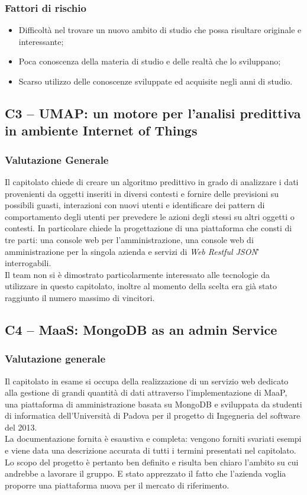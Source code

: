 \subsubsection{Fattori di rischio}
\begin{itemize}
\item Difficoltà nel trovare un nuovo ambito di studio che possa risultare originale e interessante;
\item Poca conoscenza della materia di studio e delle realtà che lo sviluppano;
\item Scarso utilizzo delle conoscenze sviluppate ed acquisite negli anni di studio.
\end{itemize}

\subsection{C3 – UMAP: un motore per l'analisi predittiva in ambiente Internet of Things}
\subsubsection{Valutazione Generale}
Il capitolato chiede di creare un algoritmo predittivo in grado di analizzare i dati provenienti da oggetti inseriti in diversi contesti e fornire delle previsioni su possibili guasti, interazioni con nuovi utenti e identificare dei pattern di comportamento degli utenti per prevedere le azioni degli stessi su altri oggetti o contesti. In particolare chiede la progettazione di una piattaforma che consti di tre parti: una console web per l'amministrazione, una console web di amministrazione per la singola azienda e servizi di \textit{Web Restful JSON\G\,} interrogabili.\\
Il team non si è dimostrato particolarmente interessato alle tecnologie da utilizzare in questo capitolato, inoltre al momento della scelta era già stato raggiunto il numero massimo di vincitori.

\subsection{C4 – MaaS: MongoDB as an admin Service}
\subsubsection{Valutazione generale}
Il capitolato in esame si occupa della realizzazione di un servizio web dedicato alla gestione di grandi quantità di dati attraverso l'implementazione di MaaP, una piattaforma di amministrazione basata su MongoDB e sviluppata da studenti di informatica dell'Università di Padova per il progetto di Ingegneria del software del 2013.\\
La documentazione fornita è esaustiva e completa: vengono forniti svariati esempi e viene data una descrizione accurata di tutti i termini presentati nel capitolato. Lo scopo del progetto è pertanto ben definito e risulta ben chiaro l'ambito su cui andrebbe a lavorare il gruppo. E stato apprezzato il fatto che l'azienda voglia proporre una piattaforma nuova per il mercato di riferimento.


